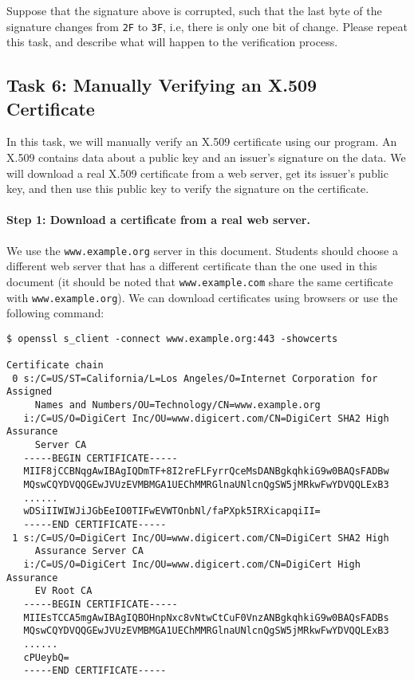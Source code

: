 Suppose that the signature above is corrupted, such that the
last byte of the signature changes from \texttt{2F} to \texttt{3F}, i.e, there is only one bit
of change.  Please repeat this task,
and describe what will happen to the verification process.




\subsection{Task 6: Manually Verifying an X.509 Certificate}

In this task, we will manually verify an X.509 certificate using our program.
An X.509 contains data about a public key and an issuer's signature on the data.
We will download a real X.509 certificate from a web server, get its issuer's public key, and then
use this public key to verify the signature on the certificate.


\paragraph{Step 1: Download a certificate from a real web server.}
We use the \texttt{www.example.org} server in this document. Students
should choose a different web server that has a different certificate than the one used in this
document (it should be noted that \texttt{www.example.com} share the same certificate with
\texttt{www.example.org}).
We can download certificates using browsers or use the following command:

\begin{lstlisting}
$ openssl s_client -connect www.example.org:443 -showcerts

Certificate chain
 0 s:/C=US/ST=California/L=Los Angeles/O=Internet Corporation for Assigned
     Names and Numbers/OU=Technology/CN=www.example.org
   i:/C=US/O=DigiCert Inc/OU=www.digicert.com/CN=DigiCert SHA2 High Assurance
     Server CA
   -----BEGIN CERTIFICATE-----
   MIIF8jCCBNqgAwIBAgIQDmTF+8I2reFLFyrrQceMsDANBgkqhkiG9w0BAQsFADBw
   MQswCQYDVQQGEwJVUzEVMBMGA1UEChMMRGlnaUNlcnQgSW5jMRkwFwYDVQQLExB3
   ......
   wDSiIIWIWJiJGbEeIO0TIFwEVWTOnbNl/faPXpk5IRXicapqiII=
   -----END CERTIFICATE-----
 1 s:/C=US/O=DigiCert Inc/OU=www.digicert.com/CN=DigiCert SHA2 High
     Assurance Server CA
   i:/C=US/O=DigiCert Inc/OU=www.digicert.com/CN=DigiCert High Assurance
     EV Root CA
   -----BEGIN CERTIFICATE-----
   MIIEsTCCA5mgAwIBAgIQBOHnpNxc8vNtwCtCuF0VnzANBgkqhkiG9w0BAQsFADBs
   MQswCQYDVQQGEwJVUzEVMBMGA1UEChMMRGlnaUNlcnQgSW5jMRkwFwYDVQQLExB3
   ......
   cPUeybQ=
   -----END CERTIFICATE-----
\end{lstlisting}

